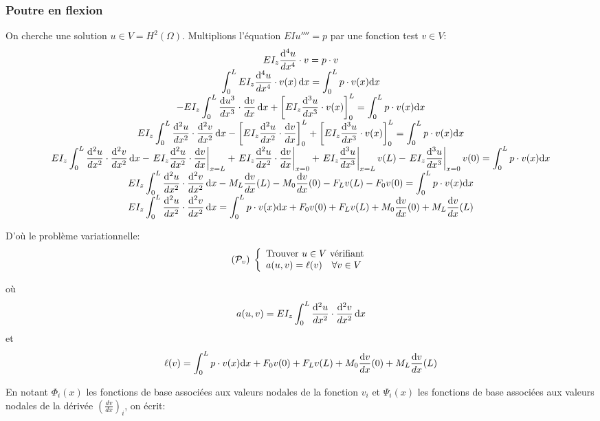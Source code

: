 \documentclass[a4paper]{article}
\def \de {{\rm d}}
\begin{document}
\subsubsection*{Poutre en flexion}
On cherche une solution $u\in V=H^2(\Omega)$. Multiplions l'équation $EIu''''=p$ par une fonction test $v\in V$:
\[
\begin{array}{c}
\displaystyle EI_z\frac{\de^4 u}{dx^4}\cdot v=p\cdot v\\
\displaystyle \int_0^LEI_z\frac{\de^4 u}{dx^4}\cdot v(x)\,\de x=\int_0^L p\cdot v(x)\de x\\
-\displaystyle EI_z\int_0^L\frac{\de u^3}{dx^3}\cdot \frac{\de v}{dx}\,\de x+\left[ EI_z\frac{\de^3 u}{dx^3} \cdot v(x)\right]_0^L=\int_0^L p\cdot v(x)\de x\\
\displaystyle EI_z\int_0^L\frac{\de^2 u}{dx^2}\cdot \frac{\de^2 v}{dx^2}\,\de x-\left[ EI_z\frac{\de^2 u}{dx^2} \cdot \frac{\de v}{dx} \right]_0^L+\left[ EI_z\frac{\de^3 u}{dx^3} \cdot v(x)\right]_0^L=\int_0^L p\cdot v(x)\de x\\
\displaystyle EI_z\int_0^L\frac{\de^2 u}{dx^2}\cdot \frac{\de^2 v}{dx^2}\,\de x- \left. EI_z
\frac{\de^2 u}{dx^2} \cdot \frac{\de v}{dx} \right|_{x=L} +\left. EI_z
\frac{\de^2 u}{dx^2} \cdot \frac{\de v}{dx}  \right|_{x=0} +
\left. EI_z\frac{\de^3 u}{dx^3} \right|_{x=L} v(L) - \left. EI_z\frac{\de^3 u}{dx^3} \right|_{x=0} v(0)
=\int_0^L p\cdot v(x)\de x\\
\displaystyle EI_z\int_0^L\frac{\de^2 u}{dx^2}\cdot \frac{\de^2 v}{dx^2}\,\de x-  M_L \frac{\de v}{dx}(L)-  M_0 \frac{\de v}{dx}(0)-F_Lv(L) - F_0 v(0)
=\int_0^L p\cdot v(x)\de x\\
\displaystyle EI_z\int_0^L\frac{\de^2 u}{dx^2}\cdot \frac{\de^2 v}{dx^2}\,\de x= \int_0^L p\cdot v(x)\de x+ F_0 v(0) +F_Lv(L) +  M_0 \frac{\de v}{dx}(0) + M_L \frac{\de v}{dx}(L)
\end{array}
\]

D'où le problème variationnelle:
\[
({\cal P}_v)\;\left\{
\begin{array}{l}
\mbox{Trouver } u\in V \mbox{ vérifiant}\\
a(u,v)=\ell(v)\quad \forall v\in V
\end{array}
\right.
\]

où \[ a(u,v)=\displaystyle EI_z\int_0^L\frac{\de^2 u}{dx^2}\cdot \frac{\de^2 v}{dx^2}\,\de x\]
et \[ \ell(v)=\int_0^L p\cdot v(x)\de x+ F_0 v(0) +F_Lv(L) +  M_0 \frac{\de v}{dx}(0) + M_L \frac{\de v}{dx}(L)\]



En notant $\Phi_{i}(x)$ les fonctions de base associées aux valeurs nodales de la fonction $v_{i}$ et $\Psi_{i}(x)$ les fonctions de base associées aux valeurs nodales de la dérivée $(\frac{dv}{dx})_{i}$, on écrit:
\end{document}
